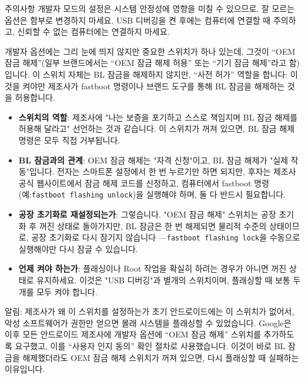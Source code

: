 \begin{tcbwarn}{주의사항}
개발자 모드의 설정은 시스템 안정성에 영향을 미칠 수 있으므로, 잘 모르는 옵션은 함부로 변경하지 마세요. USB 디버깅을 켠 후에는 컴퓨터에 연결할 때 주의하고, 신뢰할 수 없는 컴퓨터에는 연결하지 마세요.

\end{tcbwarn}


개발자 옵션에는 그리 눈에 띄지 않지만 중요한 스위치가 하나 있는데, 그것이 “OEM 잠금 해제”(일부 브랜드에서는 “OEM 잠금 해제 허용” 또는 “기기 잠금 해제”라고 함)입니다. 이 스위치 자체는 BL 잠금을 해제하지 않지만, “사전 허가” 역할을 합니다: 이것을 켜야만 제조사가 fastboot 명령이나 브랜드 도구를 통해 BL 잠금을 해제하는 것을 허용합니다.

\begin{itemize}
  \item \textbf{스위치의 역할}: 제조사에 "나는 보증을 포기하고 스스로 책임지며 BL 잠금 해제를 허용해 달라고" 선언하는 것과 같습니다. 이 스위치가 꺼져 있으면, BL 잠금 해제 명령은 모두 직접 거부됩니다.
  \item \textbf{BL 잠금과의 관계}: OEM 잠금 해제는 "자격 신청"이고, BL 잠금 해제가 "실제 작동"입니다. 전자는 스마트폰 설정에서 한 번 누르기만 하면 되지만, 후자는 제조사 공식 웹사이트에서 잠금 해제 코드를 신청하고, 컴퓨터에서 fastboot 명령(예:\texttt{fastboot flashing unlock})을 실행해야 하며, 둘 다 반드시 필요합니다.
  \item \textbf{공장 초기화로 재설정되는가}: 그렇습니다. "OEM 잠금 해제" 스위치는 공장 초기화 후 꺼진 상태로 돌아가지만, BL 잠금은 한 번 해제되면 물리적 수준의 상태이므로, 공장 초기화로 다시 잠기지 않습니다 —\texttt{fastboot flashing lock}을 수동으로 실행해야만 다시 잠글 수 있습니다.
  \item \textbf{언제 켜야 하는가}: 플래싱이나 Root 작업을 확실히 하려는 경우가 아니면 꺼진 상태로 유지하세요. 이것은 "USB 디버깅"과 별개의 스위치이며, 플래싱할 때 보통 두 개를 모두 켜야 합니다.
\end{itemize}

\begin{tcbinfo}{알림: 제조사가 왜 이 스위치를 설정하는가}
초기 안드로이드에는 이 스위치가 없어서, 악성 소프트웨어가 권한만 얻으면 몰래 시스템을 플래싱할 수 있었습니다. Google은 이후 모든 안드로이드 제조사에 개발자 옵션에 “OEM 잠금 해제” 스위치를 추가하도록 요구했고, 이를 “사용자 인지 동의” 확인 절차로 사용했습니다. 이것이 바로 BL 잠금을 해제했더라도 OEM 잠금 해제 스위치가 꺼져 있으면, 다시 플래싱할 때 실패하는 이유입니다.

\end{tcbinfo}

